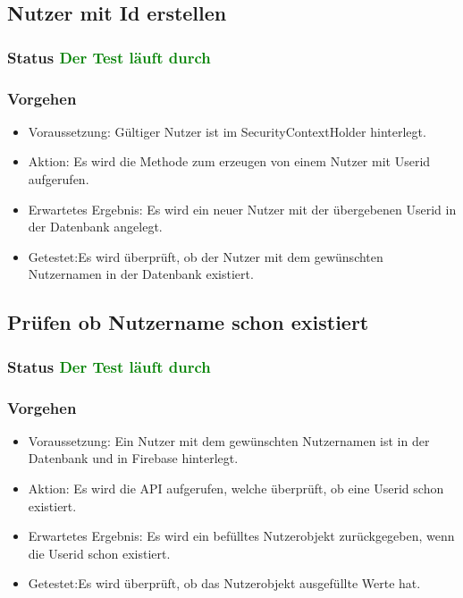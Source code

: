 \subsection{Nutzer mit Id erstellen}
\subsubsection{Status \textcolor{green}{ Der Test läuft durch} }
\subsubsection{Vorgehen}
\begin{itemize}
	\item Voraussetzung: Gültiger Nutzer ist im SecurityContextHolder hinterlegt.
	\item Aktion: Es wird die Methode zum erzeugen von einem Nutzer mit Userid aufgerufen.
	\item Erwartetes Ergebnis: Es wird ein neuer Nutzer mit der übergebenen Userid in der Datenbank angelegt.
	\item Getestet:Es wird überprüft, ob der Nutzer mit dem gewünschten Nutzernamen in der Datenbank existiert.
\end{itemize}

\subsection{Prüfen ob Nutzername schon existiert}
\subsubsection{Status \textcolor{green}{ Der Test läuft durch} }
\subsubsection{Vorgehen}
\begin{itemize}
	\item Voraussetzung: Ein Nutzer mit dem gewünschten Nutzernamen ist in der Datenbank und in Firebase hinterlegt.
	\item Aktion: Es wird die API aufgerufen, welche überprüft, ob eine Userid schon existiert.
	\item Erwartetes Ergebnis: Es wird ein befülltes Nutzerobjekt zurückgegeben, wenn die Userid schon existiert.
	\item Getestet:Es wird überprüft, ob das Nutzerobjekt ausgefüllte Werte hat.
\end{itemize}

